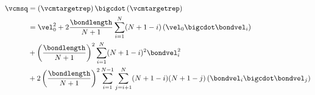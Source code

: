 \begin{equation}
\label{eq:vcmsq}
\begin{aligned}
    \vcmsq
      &= \left(\vcmtargetrep\right) \bigcdot \left(\vcmtargetrep\right) \\
      &= \vel^2_{0}
        + 2 \frac{\bondlength}{N+1}\sum_{i=1}^{N}(N + 1 - i)
          \left(
            \vel_{0} \bigcdot \bondvel_{i}
          \right) \\
      &+ \left(\frac{\bondlength }{N+1}\right)^2
          \sum_{i=1}^{N} (N + 1 - i)^2 \bondvel^2_{i} \\
      &+ 2 \left(\frac{\bondlength}{N+1}\right)^2
          \sum_{i=1}^{N-1}\sum_{j=i+1}^{N}
            (N + 1 - i)(N + 1 - j)
          \left(
            \bondvel_{i} \bigcdot \bondvel_{j}
          \right) \\
\end{aligned}
\end{equation}
